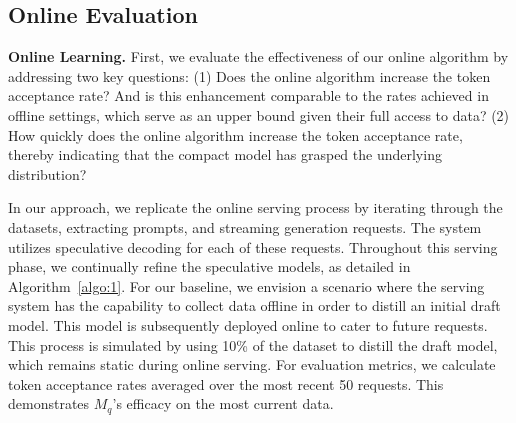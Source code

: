 \subsection{Online Evaluation}
\label{sec:eval:online_evaluation}
{\bf Online Learning.} First, we evaluate the effectiveness of our online algorithm by addressing two key questions: (1) Does the online algorithm increase the token acceptance rate? And is this enhancement comparable to the rates achieved in offline settings, which serve as an upper bound given their full access to data? (2) How quickly does the online algorithm increase the token acceptance rate, thereby indicating that the compact model has grasped the underlying distribution?

In our approach, we replicate the online serving process by iterating through the datasets, extracting prompts, and streaming generation requests. The system utilizes speculative decoding for each of these requests. Throughout this serving phase, we continually refine the speculative models, as detailed in Algorithm~\ref{algo:1}.
For our baseline, we envision a scenario where the serving system has the capability to collect data offline in order to distill an initial draft model. This model is subsequently deployed online to cater to future requests. This process is simulated by using 10\% of the dataset to distill the draft model, which remains static during online serving.
For evaluation metrics, we calculate token acceptance rates averaged over the most recent 50 requests. This demonstrates $M_q$'s efficacy on the most current data.

